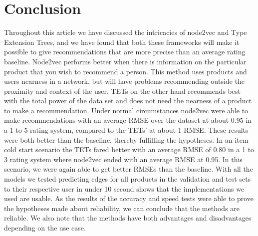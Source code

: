 \section{Conclusion}
Throughout this article we have discussed the intricacies of node2vec and Type Extension Trees, and we have found that both these frameworks will make it possible to give recommendations that are more precise than an average rating baseline.
Node2vec performs better when there is information on the particular product that you wish to recommend a person.
This method uses products and users nearness in a network, but will have problems recommending outside the proximity and context of the user.
TETs on the other hand recommends best with the total power of the data set and does not need the nearness of a product to make a recommendation.
Under normal circumstances node2vec were able to make recommendations with an average RMSE over the dataset at about 0.95 in a 1 to 5 rating system, compared to the TETs' at about 1 RMSE.
These results were both better than the baseline, thereby fulfilling the hypotheses.
In an item cold start scenario the TETs fared better with an average RMSE of 0.80 in a 1 to 3 rating system where node2vec ended with an average RMSE at 0.95.
In this scenario, we were again able to get better RMSEs than the baseline.
With all the models we tested predicting edges for all products in the validation and test sets to their respective user in under 10 second shows that the implementations we used are usable.
As the results of the accuracy and speed tests were able to prove the hypotheses made about reliability, we can conclude that the methods are reliable.
We also note that the methods have both advantages and disadvantages depending on the use case. 
